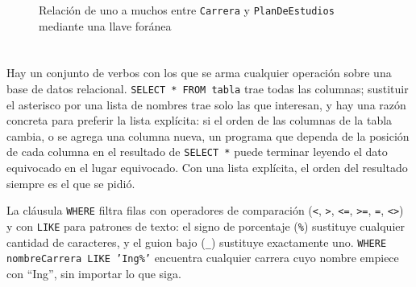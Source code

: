 \documentclass[10pt,a4paper]{article}
\begin{document}
\begin{figure}[H]
	\centering
	\caption{Relación de uno a muchos entre \texttt{Carrera} y \texttt{PlanDeEstudios} mediante una llave foránea}
	\label{img:relacion-1n}
\end{figure}

\section{\color{colorIPN}{SQL: consultas y sentencias}}

Hay un conjunto de verbos con los que se arma cualquier operación sobre una base de datos relacional. \texttt{SELECT * FROM tabla} trae todas las columnas; sustituir el asterisco por una lista de nombres trae solo las que interesan, y hay una razón concreta para preferir la lista explícita: si el orden de las columnas de la tabla cambia, o se agrega una columna nueva, un programa que dependa de la posición de cada columna en el resultado de \texttt{SELECT *} puede terminar leyendo el dato equivocado en el lugar equivocado. Con una lista explícita, el orden del resultado siempre es el que se pidió.

La cláusula \texttt{WHERE} filtra filas con operadores de comparación (\texttt{<}, \texttt{>}, \texttt{<=}, \texttt{>=}, \texttt{=}, \texttt{<>}) y con \texttt{LIKE} para patrones de texto: el signo de porcentaje (\texttt{\%}) sustituye cualquier cantidad de caracteres, y el guion bajo (\texttt{\_}) sustituye exactamente uno. \texttt{WHERE nombreCarrera LIKE 'Ing\%'} encuentra cualquier carrera cuyo nombre empiece con \enquote{Ing}, sin importar lo que siga.
\end{document}
